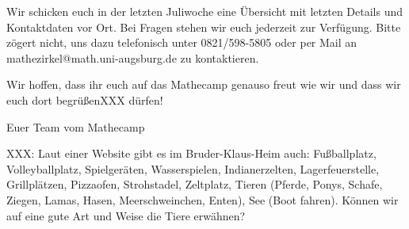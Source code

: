 \documentclass{zettel}
\begin{document}
Wir schicken euch in der letzten Juliwoche eine Übersicht mit
letzten Details und Kontaktdaten vor Ort. Bei Fragen stehen wir euch jederzeit
zur Verfügung. Bitte zögert nicht, uns dazu telefonisch unter 0821/598-5805 oder per
Mail an \textsf{mathezirkel@math.uni-augsburg.de} zu kontaktieren.

Wir hoffen, dass ihr euch auf das Mathecamp genauso freut wie wir und dass wir
euch dort begrüßenXXX dürfen!

\vspace{2em}

Euer Team vom Mathecamp

\vfill

XXX: Laut einer Website gibt es im Bruder-Klaus-Heim auch:
Fußballplatz, Volleyballplatz, Spielgeräten, Wasserspielen, Indianerzelten,
Lagerfeuerstelle, Grillplätzen, Pizzaofen, Strohstadel, Zeltplatz, Tieren
(Pferde, Ponys, Schafe, Ziegen, Lamas, Hasen, Meerschweinchen, Enten), See
(Boot fahren). Können wir auf eine gute Art und Weise die Tiere erwähnen?

\end{document}
